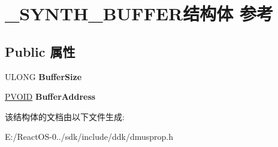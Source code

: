 \hypertarget{struct___s_y_n_t_h___b_u_f_f_e_r}{}\section{\+\_\+\+S\+Y\+N\+T\+H\+\_\+\+B\+U\+F\+F\+E\+R结构体 参考}
\label{struct___s_y_n_t_h___b_u_f_f_e_r}
\subsection*{Public 属性}
\begin{DoxyCompactItemize}
\item 
\mbox{\label{struct___s_y_n_t_h___b_u_f_f_e_r_afe69a0f87ae27af97f411bc290df1b09}} 
U\+L\+O\+NG {\bfseries Buffer\+Size}
\item 
\mbox{\label{struct___s_y_n_t_h___b_u_f_f_e_r_ae3befa0bce8b612682956e1ebcf18fe9}} 
\hyperlink{interfacevoid}{P\+V\+O\+ID} {\bfseries Buffer\+Address}
\end{DoxyCompactItemize}


该结构体的文档由以下文件生成\+:\begin{DoxyCompactItemize}
\item 
E\+:/\+React\+O\+S-\/0../sdk/include/ddk/dmusprop.\+h\end{DoxyCompactItemize}
